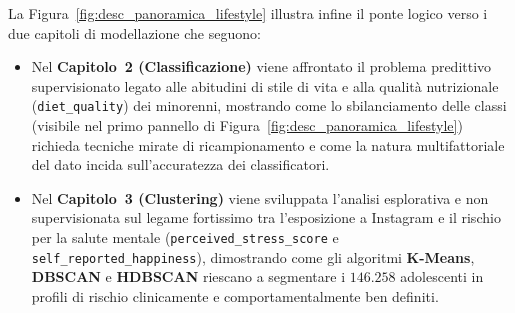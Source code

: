 La Figura~\ref{fig:desc_panoramica_lifestyle} illustra infine il ponte logico verso i due capitoli di modellazione che seguono:
\begin{itemize}
    \item Nel \textbf{Capitolo~2 (Classificazione)} viene affrontato il problema predittivo supervisionato legato alle abitudini di stile di vita e alla qualità nutrizionale (\texttt{diet\_quality}) dei minorenni, mostrando come lo sbilanciamento delle classi (visibile nel primo pannello di Figura~\ref{fig:desc_panoramica_lifestyle}) richieda tecniche mirate di ricampionamento e come la natura multifattoriale del dato incida sull'accuratezza dei classificatori.
    \item Nel \textbf{Capitolo~3 (Clustering)} viene sviluppata l'analisi esplorativa e non supervisionata sul legame fortissimo tra l'esposizione a Instagram e il rischio per la salute mentale (\texttt{perceived\_stress\_score} e \texttt{self\_reported\_happiness}), dimostrando come gli algoritmi \textbf{K-Means}, \textbf{DBSCAN} e \textbf{HDBSCAN} riescano a segmentare i $146.258$ adolescenti in profili di rischio clinicamente e comportamentalmente ben definiti.
\end{itemize}
